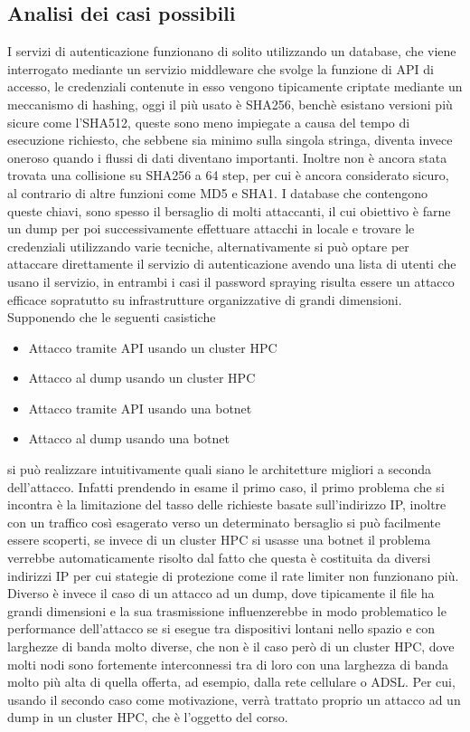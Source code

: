 \subsection{Analisi dei casi possibili}
I servizi di autenticazione funzionano di solito utilizzando un database, che viene interrogato mediante un servizio middleware che svolge la funzione di API di accesso, le credenziali contenute in esso vengono tipicamente criptate mediante un meccanismo di hashing, oggi il più usato è SHA256\cite{nist800107}, benchè esistano versioni più sicure come l'SHA512, queste sono meno impiegate a causa del tempo di esecuzione richiesto, che sebbene sia minimo sulla singola stringa, diventa invece oneroso quando i flussi di dati diventano importanti. Inoltre non è ancora stata trovata una collisione su SHA256 a 64 step, per cui è ancora considerato sicuro, al contrario di altre funzioni come MD5 e SHA1. I database che contengono queste chiavi, sono spesso il bersaglio di molti attaccanti, il cui obiettivo è farne un dump per poi successivamente effettuare attacchi in locale e trovare le credenziali utilizzando varie tecniche, alternativamente si può optare per attaccare direttamente il servizio di autenticazione avendo una lista di utenti che usano il servizio, in entrambi i casi il password spraying risulta essere un attacco efficace sopratutto su infrastrutture organizzative di grandi dimensioni. Supponendo che le seguenti casistiche 
\begin{itemize}
    \item Attacco tramite API usando un cluster HPC
    \item Attacco al dump usando un cluster HPC
    \item Attacco tramite API usando una botnet 
    \item Attacco al dump usando una botnet 
\end{itemize}
si può realizzare intuitivamente quali siano le architetture migliori a seconda dell'attacco. Infatti prendendo in esame il primo caso, il primo problema che si incontra è la limitazione del tasso delle richieste basate sull'indirizzo IP, inoltre con un traffico così esagerato verso un determinato bersaglio si può facilmente essere scoperti, se invece di un cluster HPC si usasse una botnet il problema verrebbe automaticamente risolto dal fatto che questa è costituita da diversi indirizzi IP per cui stategie di protezione come il rate limiter non funzionano più. Diverso è invece il caso di un attacco ad un dump, dove tipicamente il file ha grandi dimensioni e la sua trasmissione influenzerebbe in modo problematico le performance dell'attacco se si esegue tra dispositivi lontani nello spazio e con larghezze di banda molto diverse, che non è il caso però di un cluster HPC, dove molti nodi sono fortemente interconnessi tra di loro con una larghezza di banda molto più alta di quella offerta, ad esempio, dalla rete cellulare o ADSL. Per cui, usando il secondo caso come motivazione, verrà trattato proprio un attacco ad un dump in un cluster HPC, che è l'oggetto del corso.

